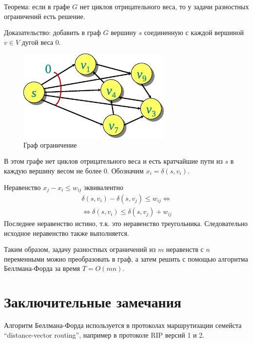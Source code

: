 \documentclass[11pt]{article}
\begin{document}
Теорема: если в графе $G$ нет циклов отрицательного веса, то у задачи разностных ограничений есть решение.

Доказательство: добавить в граф $G$ вершину $s$ соединенную с каждой вершиной $v \in V$ дугой веса $0$.
\begin{figure}[h!]
  \centering
  \includegraphics[width=3in]{lecture18/graph1.eps}
  \caption{Граф ограничение}
\end{figure}
В этом графе нет циклов отрицательного веса и есть кратчайшие пути из $s$ в каждую вершину весом не более $0$. Обозначим $x_i = \delta(s, v_i)$.

Неравенство $x_j - x_i \leqslant w_{i j}$ эквивалентно
\begin{align*}
   \delta(s, v_i) - \delta(s, v_j) \leqslant w_{i j} \iff \\
   \iff \delta(s, v_i) \leqslant \delta(s, v_j) + w_{i j}
\end{align*}
Последнее неравенство истино, т.к. это неравенство треугольника. Следовательно исходное неравенство также выполняется.

Таким образом, задачу разностных ограничений из $m$ неравенств с $n$ переменными можно преобразовать в граф, а затем решить с помощью алгоритма Беллмана-Форда за время $T = O(m n)$.

\section{Заключительные замечания}

Алгоритм Беллмана-Форда используется в протоколах маршрутизации семейста ``distance-vector routing'', например в протоколе RIP версий 1 и 2.
\end{document}
